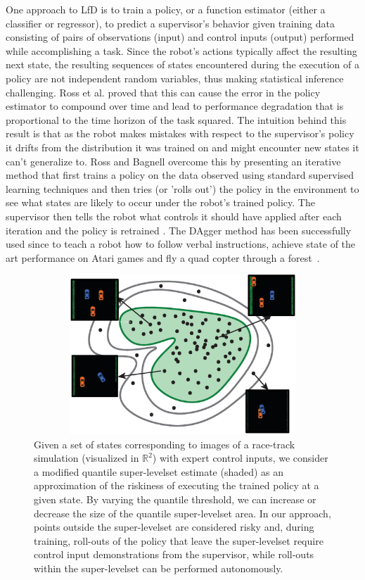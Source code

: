 \documentclass[10pt, conference]{ieeeconf}      %
\begin{document}
One approach to LfD is to train a policy, or a function estimator (either a classifier or regressor), to predict a
supervisor's behavior given training data consisting of pairs of observations (input) and control inputs (output) performed
while accomplishing a task. Since the robot's actions typically affect the resulting next state, the resulting sequences
of states encountered during the execution of a policy are not independent random variables, thus making statistical
inference challenging. Ross et al. proved that this can cause the error in the policy estimator to compound over 
time and lead to performance degradation that is proportional to the time horizon of the task squared. The intuition
behind this result is that as the robot makes mistakes with respect to the supervisor's policy it drifts from the
distribution it was trained on and might encounter new states it can't generalize to.  Ross and Bagnell overcome this by
presenting an iterative method that first trains a policy on the data observed using standard supervised learning
techniques and then tries (or 'rolls out') the policy in the environment to see what states are likely to occur under
the robot's trained policy.  The supervisor then tells the robot what controls it should have applied after each iteration
and the policy is retrained \cite{ross2010reduction}. The DAgger method has been successfully used since to teach a
robot how to follow verbal instructions, achieve state of the art performance on Atari games and fly a quad copter
through a forest~\cite{NIPS2014_5421,duvallet2013imitation,ross2013learning}.




\begin{figure}[t!]
\centering
\includegraphics[width=12cm, height=6cm]{figures/teaser.eps}
\caption{ 
Given a set of states corresponding to images of a race-track simulation (visualized in $\mathbb{R}^2$) with expert
control inputs, we consider a modified quantile super-levelset estimate (shaded) as an approximation of the riskiness of
executing the trained policy at a given state. By varying the quantile threshold, we can increase or decrease the size
of the quantile super-levelset area. In our approach, points outside the super-levelset are considered risky and, during
training, roll-outs of the policy that leave the super-levelset require control input demonstrations from the supervisor,
while roll-outs within the super-levelset can be performed autonomously.
}
\vspace*{-10pt}
\label{fig:dis_traveled}
\end{figure}
\end{document}
